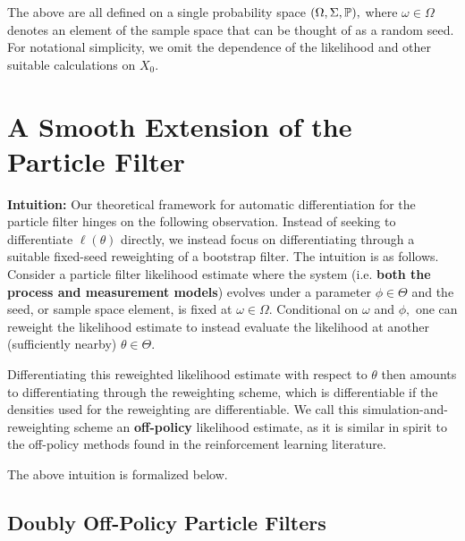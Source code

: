 \documentclass{article}
\begin{document}
The above are all defined on a single probability space $(\Omega, \Sigma, \mathbb{P}),$ where $\omega \in \Omega$ denotes an element of the sample space that can be thought of as a random seed. For notational simplicity, we omit the dependence of the likelihood and other suitable calculations on $X_0.$

\section{A Smooth Extension of the Particle Filter}

\textbf{Intuition:} Our theoretical framework for automatic differentiation for the particle filter hinges on the following observation. Instead of seeking to differentiate $\ell(\theta)$ directly, we instead focus on differentiating through a suitable fixed-seed reweighting of a bootstrap filter. The intuition is as follows. Consider a particle filter likelihood estimate where the system (i.e. \textbf{both the process and measurement models}) evolves under a parameter $\phi \in \Theta$ and the seed, or sample space element, is fixed at $\omega \in \Omega.$ Conditional on $\omega$ and $\phi,$ one can reweight the likelihood estimate to instead evaluate the likelihood at another (sufficiently nearby) $\theta \in \Theta.$ 

Differentiating this reweighted likelihood estimate with respect to $\theta$ then amounts to differentiating through the reweighting scheme, which is differentiable if the densities used for the reweighting are differentiable. We call this simulation-and-reweighting scheme an \textbf{off-policy} likelihood estimate, as it is similar in spirit to the off-policy methods found in the reinforcement learning literature.

The above intuition is formalized below.

\subsection{Doubly Off-Policy Particle Filters}
\end{document}
